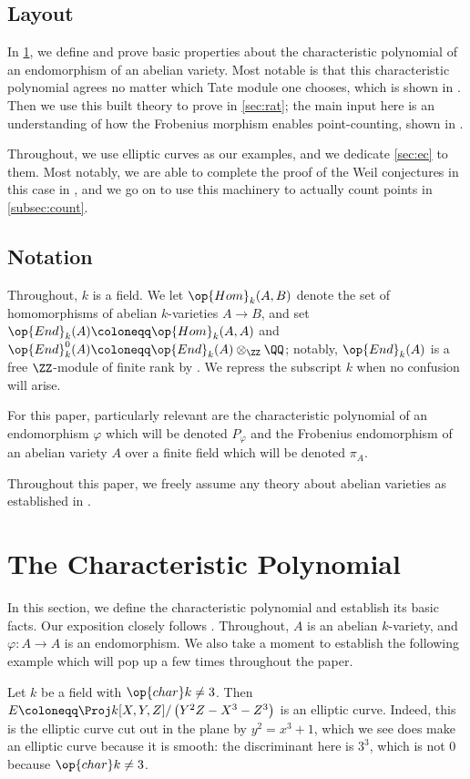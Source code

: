\documentclass{amsart}
\begin{document}
\subsection{Layout}
In \cref{sec:char-poly}, we define and prove basic properties about the characteristic polynomial of an endomorphism of an abelian variety. Most notable is that this characteristic polynomial agrees no matter which Tate module one chooses, which is shown in . Then we use this built theory to prove  in \cref{sec:rat}; the main input here is an understanding of how the Frobenius morphism enables point-counting, shown in .

Throughout, we use elliptic curves as our examples, and we dedicate \cref{sec:ec} to them. Most notably, we are able to complete the proof of the Weil conjectures in this case in , and we go on to use this machinery to actually count points in \cref{subsec:count}.

\subsection{Notation}
Throughout, $k$ is a field. We let $\op{Hom}_k(A,B)$ denote the set of homomorphisms of abelian $k$-varieties $A\to B$, and set $\op{End}_k(A)\coloneqq\op{Hom}_k(A,A)$ and $\op{End}^0_k(A)\coloneqq\op{End}_k(A)\otimes_\ZZ\QQ$; notably, $\op{End}_k(A)$ is a free $\ZZ$-module of finite rank by \cite[Corollary~3.6]{elber-av}. We repress the subscript $k$ when no confusion will arise.

For this paper, particularly relevant are the characteristic polynomial of an endomorphism $\varphi$ which will be denoted $P_\varphi$ and the Frobenius endomorphism of an abelian variety $A$ over a finite field which will be denoted $\pi_A$.
\begin{remark}
	Throughout this paper, we freely assume any theory about abelian varieties as established in \cite{elber-av}.
\end{remark}

\section{The Characteristic Polynomial} \label{sec:char-poly}
In this section, we define the characteristic polynomial and establish its basic facts. Our exposition closely follows \cite[Section~I.10]{milne-av}. Throughout, $A$ is an abelian $k$-variety, and $\varphi\colon A\to A$ is an endomorphism. We also take a moment to establish the following example \cite[Example~2.1]{elber-av} which will pop up a few times throughout the paper.
\begin{example} \label{ex:ec}
	Let $k$ be a field with $\op{char}k\ne3$. Then $E\coloneqq\Proj k[X,Y,Z]/\left(Y^2Z-X^3-Z^3\right)$ is an elliptic curve. Indeed, this is the elliptic curve cut out in the plane by $y^2=x^3+1$, which we see does make an elliptic curve because it is smooth: the discriminant here is $3^3$, which is not $0$ because $\op{char}k\ne3$.
\end{example}
\end{document}
